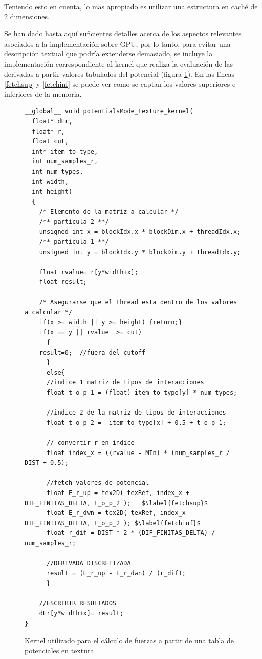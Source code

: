 Teniendo esto en cuenta, lo mas apropiado es utilizar una estructura en caché de 2 dimensiones.



Se han dado hasta aquí suficientes detalles acerca de los aspectos relevantes asociados a la implementación sobre GPU, por lo tanto, para evitar una descripción textual que podría extenderse demasiado, 
se incluye la implementación correspondiente al kernel que realiza la evaluación de las derivadas a partir valores tabulados del potencial (figura \ref{code:potentialsKernel}).
En las líneas \ref{fetchsup} y \ref{fetchinf} se puede ver como se captan los valores superiores e inferiores de la memoria.

\begin{figure}[htbp]
    \begin{lstlisting}
__global__ void potentialsMode_texture_kernel(
  float* dEr,
  float* r, 
  float cut, 
  int* item_to_type, 
  int num_samples_r, 
  int num_types, 
  int width, 
  int height)
  {
    /* Elemento de la matriz a calcular */
    /** particula 2 **/
    unsigned int x = blockIdx.x * blockDim.x + threadIdx.x;	
    /** particula 1 **/
    unsigned int y = blockIdx.y * blockDim.y + threadIdx.y;
    
    float rvalue= r[y*width+x]; 
    float result;
    
    /* Asegurarse que el thread esta dentro de los valores a calcular */
    if(x >= width || y >= height) {return;}
    if(x == y || rvalue  >= cut) 
      {
	result=0;  //fuera del cutoff
      }
      else{
      //indice 1 matriz de tipos de interacciones
      float t_o_p_1 = (float) item_to_type[y] * num_types;	
      
      //indice 2 de la matriz de tipos de interacciones
      float t_o_p_2 =  item_to_type[x] + 0.5 + t_o_p_1;	
      
      // convertir r en indice
      float index_x = ((rvalue - MIn) * (num_samples_r / DIST + 0.5);	
      
      //fetch valores de potencial
      float E_r_up = tex2D( texRef, index_x + DIF_FINITAS_DELTA, t_o_p_2 );   $\label{fetchsup}$
      float E_r_dwn = tex2D( texRef, index_x - DIF_FINITAS_DELTA, t_o_p_2 ); $\label{fetchinf}$
      float r_dif = DIST * 2 * (DIF_FINITAS_DELTA) / num_samples_r;
      
      //DERIVADA DISCRETIZADA
      result = (E_r_up - E_r_dwn) / (r_dif); 
      }
   
    //ESCRIBIR RESULTADOS
    dEr[y*width+x]= result;
}
    \end{lstlisting}
    \caption{Kernel utilizado para el cálculo de fuerzas a partir de una tabla de potenciales en textura}
    \label{code:potentialsKernel}
\end{figure}




